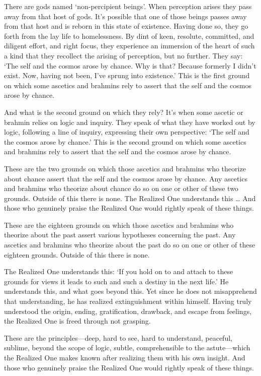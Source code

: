 \documentclass[12pt,openany]{book}%
\begin{document}
There are gods named ‘non-percipient beings’. When perception arises they pass away from that host of gods. It’s possible that one of those beings passes away from that host and is reborn in this state of existence. Having done so, they go forth from the lay life to homelessness. By dint of keen, resolute, committed, and diligent effort, and right focus, they experience an immersion of the heart of such a kind that they recollect the arising of perception, but no further. They say: ‘The self and the cosmos arose by chance. Why is that? Because formerly I didn’t exist. Now, having not been, I’ve sprung into existence.’ This is the first ground on which some ascetics and brahmins rely to assert that the self and the cosmos arose by chance. 

And what is the second ground on which they rely? It’s when some ascetic or brahmin relies on logic and inquiry. They speak of what they have worked out by logic, following a line of inquiry, expressing their own perspective: ‘The self and the cosmos arose by chance.’ This is the second ground on which some ascetics and brahmins rely to assert that the self and the cosmos arose by chance. 

These are the two grounds on which those ascetics and brahmins who theorize about chance assert that the self and the cosmos arose by chance. Any ascetics and brahmins who theorize about chance do so on one or other of these two grounds. Outside of this there is none. The Realized One understands this … And those who genuinely praise the Realized One would rightly speak of these things. 

These are the eighteen grounds on which those ascetics and brahmins who theorize about the past assert various hypotheses concerning the past. Any ascetics and brahmins who theorize about the past do so on one or other of these eighteen grounds. Outside of this there is none. 

The Realized One understands this: ‘If you hold on to and attach to these grounds for views it leads to such and such a destiny in the next life.’ He understands this, and what goes beyond this. Yet since he does not misapprehend that understanding, he has realized extinguishment within himself. Having truly understood the origin, ending, gratification, drawback, and escape from feelings, the Realized One is freed through not grasping. 

These are the principles—deep, hard to see, hard to understand, peaceful, sublime, beyond the scope of logic, subtle, comprehensible to the astute—which the Realized One makes known after realizing them with his own insight. And those who genuinely praise the Realized One would rightly speak of these things. 
\end{document}
